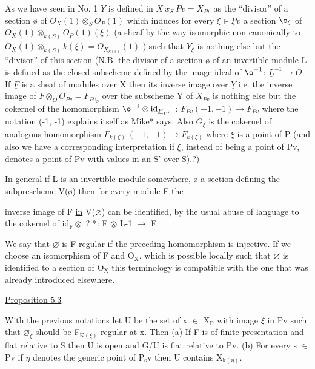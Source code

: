 \documentclass[11pt]{article}
\newcommand{\scanpage}[1]{\par\bigskip\noindent{\small\sffamily[scan #1]}\par}
\newcommand{\mspage}[1]{{\small\sffamily[p.\,#1]}}
\newcommand{\uline}[1]{\underline{#1}}
\begin{document}
As we have seen in No. 1 $\underline{Y}$ is defined in $X\ x_S\ Pv = X_{Pv}$ as the
``divisor'' of a section {\o} of $O_X(1) \otimes_S O_P(1)$ which induces for every
$\xi \in \underline{P}v$ a section ${\o}_{\xi}$ of $O_X(1) \otimes_{k(S)} O_P(1)(\xi)$ (a sheaf by the way
isomorphic non-canonically to $O_X(1) \otimes_{k(S)} k(\xi) = O_{X_{k(s)}}(1)$ )
such that $Y_{\xi}$ is nothing else but the ``divisor'' of this section
(N.B. the divisor of a section {\o} of an invertible module L is
defined as the closed subscheme defined by the image ideal of
${\o}^{-1}$: $\underline{L}^{-1} \to O$.  If $\underline{F}$ is a sheaf of modules over X then its inverse
image over $\underline{Y}$ i.e. the inverse image of $F \otimes_O O_{Pv} = F_{Pv_{S}}$ over
the subscheme Y of $X_{Pv}$ is nothing else but the cokernel of the
homomorphism ${\o}^{-1} \otimes \mathrm{id}_{\underline{F}_{P^v}}$ : $F_{Pv}(-1, -1) \to F_{Pv}$ where the
notation (-1, -1) explains itself as Mike* says.  Also $G_{\xi}$ is the
cokernel of analogous homomorphism $F_{k(\xi)}\ (-1, -1) \to F_{k(\xi)}$ where $\xi$ is
a point of P (and also we have a corresponding interpretation if $\xi$,
instead of being a point of Pv, denotes a point of Pv with values
in an S' over S).?)

In general if L is an invertible module somewhere, {\o} a
section defining the subprescheme V({\o}) then for every module F the

\clearpage
\scanpage{24/27}
\mspage{27}

inverse image of F \uline{in} V($\varnothing$) can be identified, by the usual abuse
of language to the cokernel of id$_{\mathrm{F}}\otimes$ ? *: F $\otimes$ L-1 $\rightarrow$ F.

We say that $\varnothing$ is F regular if the preceding homomorphism is
injective.  If we choose an isomorphism of F and O$_{\mathrm{X}}$, which is
possible locally such that $\varnothing$ is identified to a section of O$_{\mathrm{X}}$ this
terminology is compatible with the one that was already introduced
elsewhere.

\uline{Proposition 5.3}

With the previous notations let U be the set of x $\in$ X$_{\mathrm{P}}$ with
image $\xi$ in Pv such that $\varnothing_{\xi}$ should be F$_{\mathrm{K}(\xi)}$ regular at x.  Then (a)
If F is of finite presentation and flat relative to S then U is
open and $\underline{\mathrm{G}}$/U is flat relative to Pv.  (b) For every s $\in$ Pv if $\eta$
denotes the generic point of P$_{\mathrm{s}}$v then U contains X$_{\mathrm{k}(\eta)}$.
\end{document}
